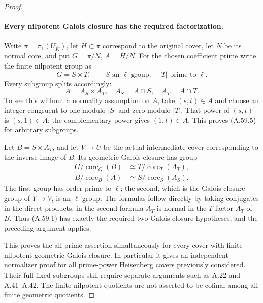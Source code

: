 \begin{proof}
\paragraph{Every nilpotent Galois closure has the required factorization.}
Write \(\pi=\pi_1(U_{\overline K})\), let \(H\subset\pi\)
correspond to the original cover, let \(N\) be its normal
core, and put \(G=\pi/N\), \(A=H/N\). For the chosen
coefficient prime write the finite nilpotent group as
\[
                   G=S\times T,
 \qquad S\text{ an }\ell\text{-group},\quad
              |T|\text{ prime to }\ell.               \tag{A.59.4}
\]
Every subgroup splits accordingly:
\[
             A=A_S\times A_T,
             \quad A_S=A\cap S,\quad A_T=A\cap T.
                                                        \tag{A.59.5}
\]
To see this without a normality assumption on \(A\),
take \((s,t)\in A\) and choose an integer congruent
to one modulo \(|S|\) and zero modulo \(|T|\).
That power of \((s,t)\) is \((s,1)\in A\); the
complementary power gives \((1,t)\in A\). This
proves (A.59.5) for arbitrary subgroups.

Let \(B=S\times A_T\), and let \(V\to U\) be
the actual intermediate cover corresponding to the
inverse image of \(B\). Its geometric Galois closure
has group
\[
 \begin{aligned}
 G/\operatorname{core}_G(B)
    &\simeq T/\operatorname{core}_T(A_T),\\
 B/\operatorname{core}_B(A)
    &\simeq S/\operatorname{core}_S(A_S).
 \end{aligned}                                          \tag{A.59.6}
\]
The first group has order prime to \(\ell\); the
second, which is the Galois closure group of
\(Y\to V\), is an \(\ell\)-group.
The formulas follow directly by taking conjugates
in the direct products; in the second formula
\(A_T\) is normal in the \(T\)-factor \(A_T\)
of \(B\). Thus (A.59.1) has exactly the required
two Galois-closure hypotheses, and the preceding
argument applies.

This proves the all-prime assertion simultaneously
for every cover with finite nilpotent geometric
Galois closure. In particular it gives an independent
normalizer proof for all prime-power Heisenberg
covers previously considered. Their full fixed
subgroups still require separate arguments such
as A.22 and A.41--A.42. The finite nilpotent
quotients are not asserted to be cofinal among
all finite geometric quotients.
\end{proof}
